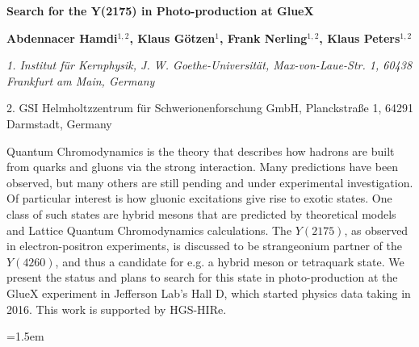 \documentclass{article}
\begin{document}
\begin{center}
{\Large\bfseries Search for the Y(2175) in Photo-production at GlueX \par}
\vspace{3ex}
{\bfseries Abdennacer Hamdi$^{1,2}$, Klaus Götzen$^{1}$, Frank Nerling$^{1,2}$, Klaus Peters$^{1,2}$ \par}
{\footnotesize\itshape
1. Institut für Kernphysik, J. W. Goethe-Universität, Max-von-Laue-Str. 1, 60438 Frankfurt am Main, Germany \par
2. GSI Helmholtzzentrum für Schwerionenforschung GmbH, Planckstraße 1, 64291 Darmstadt, Germany \par}
\vspace{3ex}
\end{center}
Quantum Chromodynamics is the theory that describes how hadrons are built from quarks and gluons via the strong 
interaction. Many predictions have been observed, but many others are still pending and under experimental 
investigation.
Of particular interest is how gluonic excitations give rise to exotic states. One class of such states are hybrid
mesons that are predicted by theoretical models and Lattice Quantum Chromodynamics calculations.
The $Y(2175)$, as observed in electron-positron experiments, is discussed to be strangeonium partner of
the $Y(4260)$, and thus a candidate for e.g. a hybrid meson or tetraquark state.
We present the status and plans to search for this state in photo-production at the GlueX experiment
in Jefferson Lab’s Hall D, which started physics data taking in 2016.
This work is supported by HGS-HIRe.

\setlength\parindent{0pt}\vspace{2ex}

\footnotesize


\hangindent=1.5em


\end{document}
